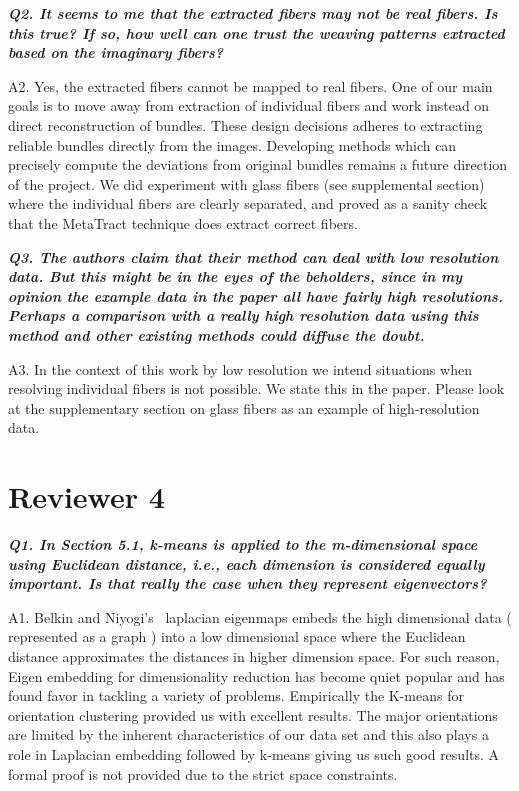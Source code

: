 \documentclass[]{article}
\begin{document}
\makebox[\linewidth]{\rule{0.25\textwidth}{0.4pt}}


\textbf{\textit{
Q2. It seems to me that the extracted fibers may not be real fibers. Is this
true? If so, how well can one trust the weaving patterns extracted based
on the imaginary fibers?
}}


A2. Yes, the extracted fibers cannot be mapped to real fibers. One of our main goals is to move away from extraction of individual fibers and work instead on direct reconstruction of bundles. These design decisions adheres to extracting reliable bundles directly from the images.
Developing methods which can precisely compute the deviations from original bundles remains a future direction of the project. We did experiment with glass fibers (see supplemental section) where the individual fibers are clearly separated, and proved as a sanity check that the MetaTract technique does extract correct fibers.
 
\makebox[\linewidth]{\rule{0.25\textwidth}{0.4pt}}


\textbf{\textit{
Q3. The authors claim that their method can deal with low resolution data.
But this might be in the eyes of the beholders, since in my opinion the example data in the paper all have fairly high resolutions. Perhaps a comparison with a really high resolution data using this method and other existing methods could diffuse the doubt.
}}


A3. In the context of this work by low resolution we intend situations when resolving individual fibers is not possible. We state this in the paper. Please look at the supplementary section on glass fibers as an example of high-resolution data.

\makebox[\linewidth]{\rule{0.25\textwidth}{0.4pt}}

\section*{Reviewer 4}

\textbf{\textit{
Q1. In Section 5.1, k-means is applied to the m-dimensional space using
Euclidean distance, i.e., each dimension is considered equally important.
Is that really the case when they represent eigenvectors?
}}


A1. Belkin  and Niyogi's~\cite{Belkin01} laplacian eigenmaps embeds the high dimensional data ( represented as a graph ) into a low dimensional space where the Euclidean distance approximates the distances in higher dimension space. For such reason, Eigen embedding for dimensionality reduction has become quiet popular and has found favor in tackling a variety of problems. Empirically the K-means for orientation clustering provided us with excellent results. The major orientations are limited by the inherent characteristics of our data set and this also plays a role in Laplacian embedding followed by k-means giving us such good results. A formal proof is not provided due to the strict space constraints.
 
\end{document}
